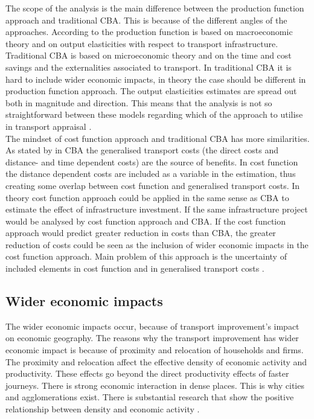 \documentclass[a4paper, 12 pt]{article}   	%
\begin{document}
The scope of the analysis is the main difference between the production function approach and traditional CBA. This is because of the different angles of the approaches. According to \cite{andersson} the production function is based on macroeconomic theory and on output elasticities with respect to transport infrastructure. Traditional CBA is based on microeconomic theory and on the time and cost savings and the externalities associated to transport. In traditional CBA it is hard to include wider economic impacts, in theory the case should be different in production function approach. The output elasticities estimates are spread out both in magnitude and direction. This means that the analysis is not so straightforward between these models regarding which of the approach to utilise in transport appraisal \citep{andersson}. \\

The mindset of cost function approach and traditional CBA has more similarities. As stated by \cite{andersson} in CBA the generalised transport costs (the direct costs and distance- and time dependent costs) are the source of benefits. In cost function the distance dependent costs are included as a variable in the estimation, thus creating some overlap between cost function and generalised transport costs. In theory cost function approach could be applied in the same sense as CBA to estimate the effect of infrastructure investment. If the same infrastructure project would be analysed by cost function approach and CBA. If the cost function approach would predict greater reduction in costs than CBA, the greater reduction of costs could be seen as the inclusion of wider economic impacts in the cost function approach. Main problem of this approach is the uncertainty of included elements in cost function and in generalised transport costs \citep{andersson}.  \\

\subsection{Wider economic impacts}

The wider economic impacts occur, because of transport improvement's impact on economic geography. The reasons why the transport improvement has wider economic impact is because of proximity and relocation of households and firms. The proximity and relocation affect the effective density of economic activity and productivity. These effects go beyond the direct productivity effects of faster journeys. There is strong economic interaction in dense places. This is why cities and agglomerations exist. There is substantial research that show the positive relationship between density and economic activity \citep{venables2017}.  \\
\end{document}
